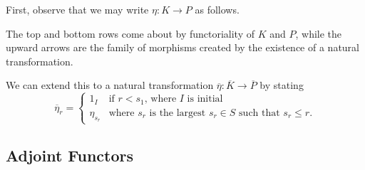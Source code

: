 First, observe that we may write $\eta: K \to P$ as follows. 
\begin{center}
\end{center}
The top and bottom rows come about by functoriality of $K$ and $P$,  
while the upward arrows are the family of morphisms created by the existence 
of a natural transformation. 

We can extend this to a natural transformation $\overline{\eta}: \overline{K} \to \overline{P}$ 
by stating 
\[
    \overline{\eta}_r = 
    \begin{cases}
        1_I & \text{if } r < s_1  \text{, where } I \text{ is initial}\\
        \eta_{s_r} & \text{where } s_r \text{ is the largest } s_r \in S \text{ such that } s_r \le r. 
    \end{cases}
\]

\subsection*{Adjoint Functors}

